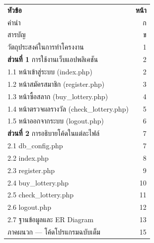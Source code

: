 \documentclass[a4paper,12pt]{article}
\begin{document}
\newlength{\tocwidth}
\setlength{\tocwidth}{\textwidth}
\addtolength{\tocwidth}{-2pt}
{\setlength{\tabcolsep}{0pt}\renewcommand{\arraystretch}{1.3}
\noindent\begin{tabularx}{\tocwidth}{@{}X@{\hspace{2pt}}r@{}}
\textbf{หัวข้อ} & \textbf{หน้า} \\
คำนำ & ก \\
สารบัญ & ข \\
วัตถุประสงค์ในการทำโครงงาน & 1 \\
\textbf{ส่วนที่ 1} การใช้งานเว็บแอปพลิเคชัน & 2 \\
\hspace{1.5em}1.1 หน้าเข้าสู่ระบบ (index.php) & 2 \\
\hspace{1.5em}1.2 หน้าสมัครสมาชิก (register.php) & 3 \\
\hspace{1.5em}1.3 หน้าซื้อสลาก (buy\_lottery.php) & 4 \\
\hspace{1.5em}1.4 หน้าตรวจผลรางวัล (check\_lottery.php) & 5 \\
\hspace{1.5em}1.5 หน้าออกจากระบบ (logout.php) & 6 \\
\textbf{ส่วนที่ 2} การอธิบายโค้ดในแต่ละไฟล์ & 7 \\
\hspace{1.5em}2.1 db\_config.php & 7 \\
\hspace{1.5em}2.2 index.php & 8 \\
\hspace{1.5em}2.3 register.php & 9 \\
\hspace{1.5em}2.4 buy\_lottery.php & 10 \\
\hspace{1.5em}2.5 check\_lottery.php & 11 \\
\hspace{1.5em}2.6 logout.php & 12 \\
\hspace{1.5em}2.7 ฐานข้อมูลและ ER Diagram & 13 \\
ภาคผนวก --- โค้ดโปรแกรมฉบับเต็ม & 15 \\
\end{tabularx}}

\newpage

\setcounter{page}{1}
\end{document}

